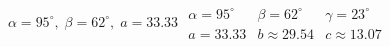 { $\alpha = 95^{\circ}, \; \beta = 62^{\circ}, \; a = 33.33$}
{$\begin{array}{lll}\alpha = 95^{\circ} & \beta = 62^{\circ} & \gamma = 23^{\circ} \\a = 33.33 & b \approx 29.54 & c \approx 13.07 \end{array}$}

